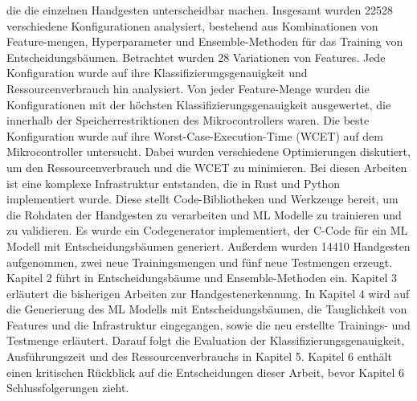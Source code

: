 die die einzelnen Handgesten unterscheidbar machen.
\newline
\newline
Insgesamt wurden 22528 verschiedene Konfigurationen analysiert, bestehend aus Kombinationen von Feature-mengen, Hyperparameter und Ensemble-Methoden für das Training von Entscheidungsbäumen.
Betrachtet wurden 28 Variationen von Features. Jede Konfiguration wurde auf ihre Klassifizierungsgenauigkeit und Ressourcenverbrauch
hin analysiert. Von jeder Feature-Menge wurden die Konfigurationen mit der höchsten Klassifizierungsgenauigkeit ausgewertet, die innerhalb der Speicherrestriktionen des Mikrocontrollers waren. Die beste
Konfiguration wurde auf ihre Worst-Case-Execution-Time (WCET) auf dem Mikrocontroller untersucht. Dabei wurden verschiedene Optimierungen diskutiert, um den Ressourcenverbrauch und die WCET zu minimieren.
Bei diesen Arbeiten ist eine komplexe Infrastruktur entstanden, die in Rust und Python implementiert wurde. Diese stellt Code-Bibliotheken und Werkzeuge bereit, um die Rohdaten der Handgesten zu verarbeiten und
ML Modelle zu trainieren und zu validieren. Es wurde ein Codegenerator implementiert, der C-Code für ein ML Modell mit Entscheidungsbäumen generiert. Außerdem wurden 14410 Handgesten aufgenommen,
zwei neue Trainingsmengen und fünf neue Testmengen erzeugt.
\newline
\newline
Kapitel 2 führt in Entscheidungsbäume und Ensemble-Methoden ein. Kapitel 3 erläutert die bisherigen Arbeiten zur Handgestenerkennung. In Kapitel 4 wird auf die Generierung des ML Modells mit Entscheidungsbäumen,
die Tauglichkeit von Features und die Infrastruktur eingegangen, sowie die neu erstellte Trainings- und Testmenge erläutert. Darauf folgt die Evaluation der Klassifizierungsgenauigkeit, Ausführungszeit
und des Ressourcenverbrauchs in Kapitel 5. Kapitel 6 enthält einen kritischen Rückblick auf die Entscheidungen dieser Arbeit, bevor Kapitel 6 Schlussfolgerungen zieht.